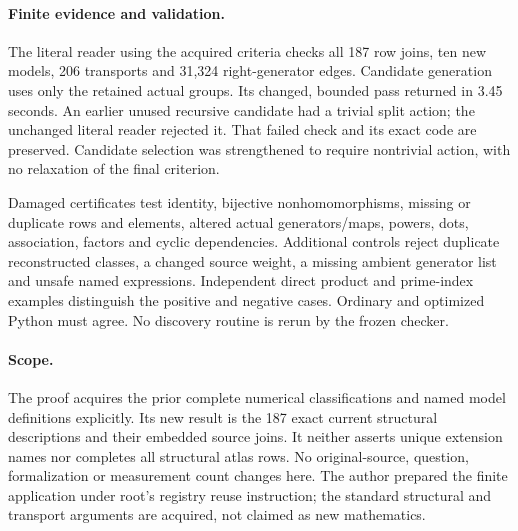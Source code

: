 \documentclass[11pt]{article}
\begin{document}
\paragraph{Finite evidence and validation.}
The literal reader using the acquired criteria checks all 187 row joins, ten new models,
206 transports and 31,324 right-generator edges. Candidate generation
uses only the retained actual groups. Its changed, bounded pass returned
in 3.45 seconds. An earlier unused recursive candidate had a trivial
split action; the unchanged literal reader rejected it. That failed check
and its exact code are preserved. Candidate selection was strengthened to
require nontrivial action, with no relaxation of the final criterion.

Damaged certificates test identity, bijective nonhomomorphisms, missing
or duplicate rows and elements, altered actual generators/maps, powers,
dots, association, factors and cyclic dependencies. Additional controls
reject duplicate reconstructed classes, a changed source weight, a missing
ambient generator list and unsafe named expressions. Independent direct
product and prime-index examples distinguish the positive and negative
cases. Ordinary and optimized Python must agree. No discovery routine is
rerun by the frozen checker.

\paragraph{Scope.}
The proof acquires the prior complete numerical classifications and named
model definitions explicitly. Its new result is the 187 exact current
structural descriptions and their embedded source joins. It neither
asserts unique extension names nor completes all structural atlas rows.
No original-source, question, formalization or measurement count changes
here. The author prepared the finite application under root's registry
reuse instruction; the standard structural and transport arguments are
acquired, not claimed as new mathematics.
\end{document}
